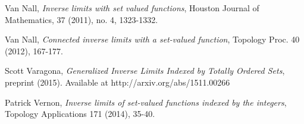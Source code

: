 \documentclass{amsart}
\theoremstyle{definition}
\begin{document}
\begin{thebibliography}{10}
 Van Nall, {\it Inverse limits with set valued functions}, Houston Journal of Mathematics, 37 (2011), no. 4, 1323-1332.

\smallskip

 Van Nall, {\it Connected inverse limits with a set-valued function}, Topology Proc. 40 (2012), 167-177.

\smallskip

 Scott Varagona, {\it Generalized Inverse Limits Indexed by Totally Ordered Sets}, preprint (2015). Available at http://arxiv.org/abs/1511.00266

\smallskip

 Patrick Vernon, {\it Inverse limits of set-valued functions indexed by the integers}, Topology Applications 171 (2014), 35-40.
\end{thebibliography}
\end{document}
